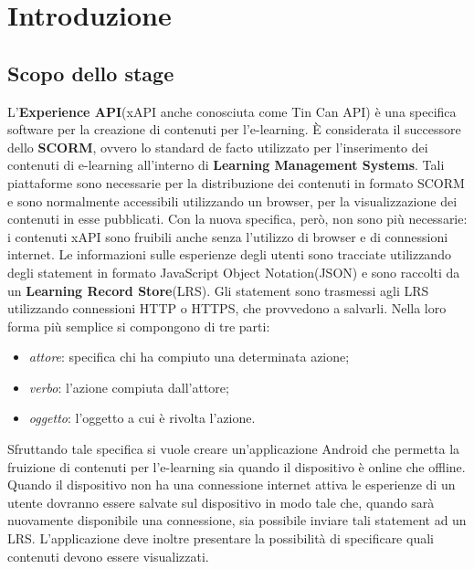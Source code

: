 \documentclass[../Tesi.tex]{subfiles}
\begin{document}
\section{Introduzione}
	
	\subsection{Scopo dello stage}
		L'\textbf{Experience API}(xAPI anche conosciuta come Tin Can API) è una specifica software per la creazione di contenuti per l'e-learning. È considerata il successore dello \textbf{SCORM}, ovvero lo standard de facto utilizzato per l'inserimento dei contenuti di e-learning all'interno di \textbf{Learning Management Systems}. Tali piattaforme sono necessarie per la distribuzione dei contenuti in formato SCORM e sono normalmente accessibili utilizzando un browser, per la visualizzazione dei contenuti in esse pubblicati. Con la nuova specifica, però, non sono più necessarie: i contenuti xAPI sono fruibili anche senza l'utilizzo di browser e di connessioni internet. Le informazioni sulle esperienze degli utenti sono tracciate utilizzando degli statement in formato JavaScript Object Notation(JSON) e sono raccolti da un \textbf{Learning Record Store}(LRS). Gli statement sono trasmessi agli LRS utilizzando connessioni HTTP o HTTPS, che provvedono a salvarli. Nella loro forma più semplice si compongono di tre parti: 
		\begin{itemize}
			\item \textit{attore}: specifica chi ha compiuto una determinata azione;
			\item \textit{verbo}: l'azione compiuta dall'attore;
			\item \textit{oggetto}: l'oggetto a cui è rivolta l'azione.
		\end{itemize}
		Sfruttando tale specifica si vuole creare un'applicazione Android che permetta la fruizione di contenuti per l'e-learning sia quando il dispositivo è online che offline. Quando il dispositivo non ha una connessione internet attiva le esperienze di un utente dovranno essere salvate sul dispositivo in modo tale che, quando sarà nuovamente disponibile una connessione, sia possibile inviare tali statement ad un LRS. L'applicazione deve inoltre presentare la possibilità di specificare quali contenuti devono essere visualizzati.
\end{document}

